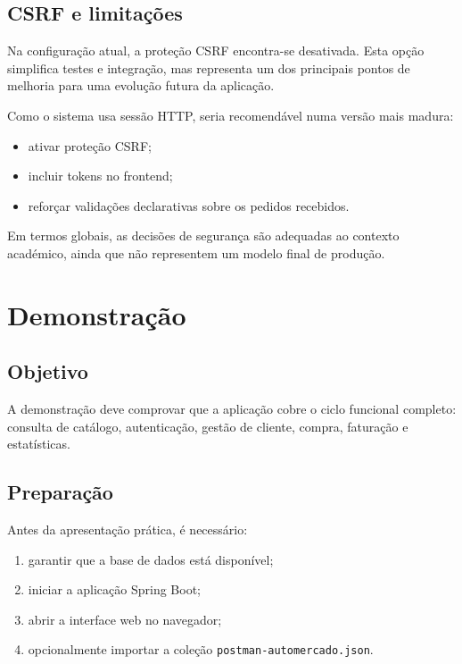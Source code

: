 \documentclass[10pt,a4paper]{report}
\begin{document}
\section{CSRF e limitações}

Na configuração atual, a proteção \ac{CSRF} encontra-se desativada. Esta opção simplifica testes e integração, mas representa um dos principais pontos de melhoria para uma evolução futura da aplicação.

Como o sistema usa sessão \ac{HTTP}, seria recomendável numa versão mais madura:

\begin{itemize}
    \item ativar proteção \ac{CSRF};
    \item incluir tokens no frontend;
    \item reforçar validações declarativas sobre os pedidos recebidos.
\end{itemize}

Em termos globais, as decisões de segurança são adequadas ao contexto académico, ainda que não representem um modelo final de produção.

\chapter{Demonstração}
\label{chap:demonstracao}

\section{Objetivo}

A demonstração deve comprovar que a aplicação cobre o ciclo funcional completo: consulta de catálogo, autenticação, gestão de cliente, compra, faturação e estatísticas.

\section{Preparação}

Antes da apresentação prática, é necessário:

\begin{enumerate}
    \item garantir que a base de dados está disponível;
    \item iniciar a aplicação Spring Boot;
    \item abrir a interface web no navegador;
    \item opcionalmente importar a coleção \texttt{postman-automercado.json}.
\end{enumerate}
\end{document}
